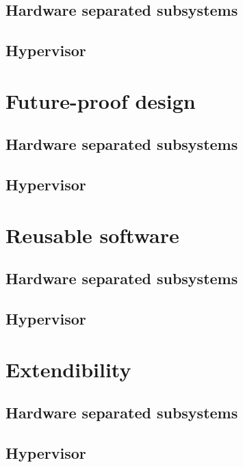 \subsection{Hardware separated subsystems}
\subsection{Hypervisor}


\section{Future-proof design}
\subsection{Hardware separated subsystems}
\subsection{Hypervisor}


\section{Reusable software}
\subsection{Hardware separated subsystems}
\subsection{Hypervisor}


\section{Extendibility}
\subsection{Hardware separated subsystems}
\subsection{Hypervisor}

